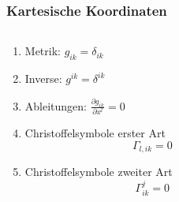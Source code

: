 %
%
%
\bgroup
\begin{frame}[t]
\setlength{\abovedisplayskip}{5pt}
\setlength{\belowdisplayskip}{5pt}
\frametitle{Kartesische Koordinaten}
\vspace{-10pt}
\begin{columns}[t,onlytextwidth]
\begin{column}{0.48\textwidth}
\begin{enumerate}
\item<2-> Metrik: $\displaystyle
g_{ik} = \delta_{ik}
$
\item<3-> Inverse: $\displaystyle
g^{ik} = \delta^{ik}
$
\item<4-> Ableitungen: $\displaystyle
\frac{\partial g_{ik}}{\partial x^l} = 0
$
\item<5-> Christoffelsymbole erster Art
\[
\Gamma_{l,ik} = 0
\]
\item<6-> Christoffelsymbole zweiter Art
\[
\Gamma^j_{ik} = 0
\]
\end{enumerate}
\end{column}
\begin{column}{0.48\textwidth}
\end{column}
\end{columns}
\end{frame}
\egroup
